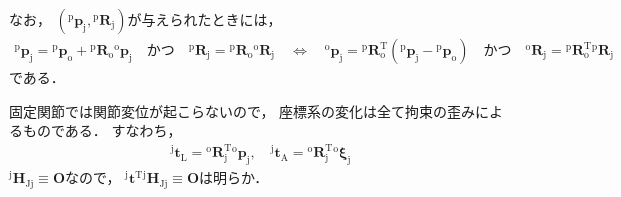 ﻿\documentclass[a4paper]{jsarticle}
\begin{document}
なお，
$({}^{\mathrm{p}}\bm{p}_{\mathrm{j}}, {}^{\mathrm{p}}\bm{R}_{\mathrm{j}})$が与えられたときには，
\begin{align*}
{}^{\mathrm{p}}\bm{p}_{\mathrm{j}}={}^{\mathrm{p}}\bm{p}_{\mathrm{o}}+{}^{\mathrm{p}}\bm{R}_{\mathrm{o}}{}^{\mathrm{o}}\bm{p}_{\mathrm{j}}
\quad\mbox{かつ}\quad
{}^{\mathrm{p}}\bm{R}_{\mathrm{j}}={}^{\mathrm{p}}\bm{R}_{\mathrm{o}}{}^{\mathrm{o}}\bm{R}_{\mathrm{j}}
\quad\Leftrightarrow\quad
{}^{\mathrm{o}}\bm{p}_{\mathrm{j}}={}^{\mathrm{p}}\bm{R}_{\mathrm{o}}^{\mathrm{T}}({}^{\mathrm{p}}\bm{p}_{\mathrm{j}}-{}^{\mathrm{p}}\bm{p}_{\mathrm{o}})
\quad\mbox{かつ}\quad
{}^{\mathrm{o}}\bm{R}_{\mathrm{j}}={}^{\mathrm{p}}\bm{R}_{\mathrm{o}}^{\mathrm{T}}{}^{\mathrm{p}}\bm{R}_{\mathrm{j}}
\end{align*}
である．


\vspace{\baselineskip}



固定関節では関節変位が起こらないので，
座標系の変化は全て拘束の歪みによるものである．
すなわち，
\begin{align*}
{}^{\mathrm{j}}\bm{t}_{\mathrm{L}}={}^{\mathrm{o}}\bm{R}_{\mathrm{j}}^{\mathrm{T}}{}^{\mathrm{o}}\bm{p}_{\mathrm{j}},\quad
{}^{\mathrm{j}}\bm{t}_{\mathrm{A}}={}^{\mathrm{o}}\bm{R}_{\mathrm{j}}^{\mathrm{T}}{}^{\mathrm{o}}\bm{\xi}_{\mathrm{j}}
\end{align*}
${}^{\mathrm{j}}\bm{H}_{\mathrm{Jj}}\equiv\bm{O}$なので，
${}^{\mathrm{j}}\bm{t}^{\mathrm{T}}{}^{\mathrm{j}}\bm{H}_{\mathrm{Jj}}\equiv\bm{O}$は明らか．

\vspace{\baselineskip}

\end{document}
